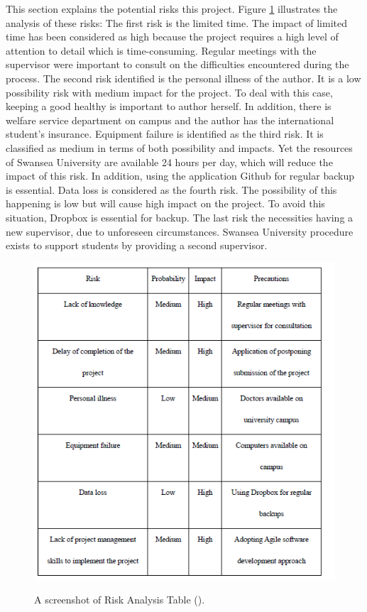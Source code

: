 This section explains the potential risks this project.
Figure \ref{fig:riskAnalysis} illustrates the analysis of these risks: The first risk is the limited time. The impact of limited time has been considered as high because the project requires a high level of attention to detail which is time-consuming. Regular meetings with the supervisor were important to consult on the difficulties encountered during the process. The second risk identified is the personal illness of the author. It is a low possibility risk with medium impact for the project. To deal with this case, keeping a good healthy is important to author herself. In addition, there is welfare service department on campus and the author has the international student’s insurance. Equipment failure is identified as the third risk. It is classified as medium in terms of both possibility and impacts. Yet the resources of  Swansea University are available 24 hours per day, which will reduce the impact of this risk. In addition, using the application Github for regular backup is essential. Data loss is considered as the fourth risk. The possibility of this happening is low but will cause high impact on the project. To avoid this situation, Dropbox is essential for backup. The last risk the necessities having a new supervisor, due to unforeseen circumstances. Swansea University procedure exists to support students by providing a second supervisor. 

\begin{figure}[H]
	\centering    
	\includegraphics[scale=1]{Figs/Risk-Analysis}\\[1ex]
	\caption{A screenshot of Risk Analysis Table (\cite{Liu}). }
	\label{fig:riskAnalysis}
\end{figure}

